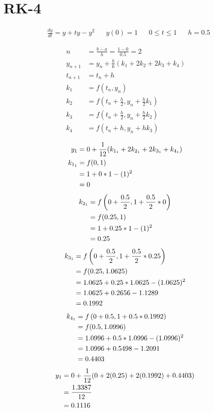 \section{RK-4}
	\begin{align}
		&\frac{dy}{dt} = y + ty - y^{2}&
		&y(0) = 1&
		&0 \leq t \leq 1&
		&h = 0.5&
	\end{align}

	\begin{align}
		n &= \frac{b-a}{h} = \frac{1 - 0}{0.5} = 2& \\
		y_{n+1} &= y_{n} + \frac{h}{6}(k_{1} + 2k_{2} + 2k_{3} + k_{4})& \\
		t_{n+1} &= t_{n} + h& \\
		k_{1} &= f(t_{n}, y_{n})& \\
		k_{2} &= f(t_{n} + \frac{h}{2}, y_{n} + \frac{h}{2}k_{1})& \\
		k_{3} &= f(t_{n} + \frac{h}{2}, y_{n} + \frac{h}{2}k_{2})& \\
		k_{4} &= f(t_{n} + h, y_{n} + hk_{3})&
	\end{align}

	\begin{align}
		y_{1} &= 0 + \frac{1}{12}(k_{1_{1}} + 2k_{2_{1}} + 2k_{3_{1}} + k_{4_{1}})& \\
		k_{1_{1}} &= f(0,1)& \notag \\
		&= 1 + 0*1 - (1)^{2}& \notag \\
		&= 0&
	\end{align}
	\begin{align}
		k_{2_{1}} &= f
			\left(
				0 + \frac{0.5}{2}, 1 + \frac{0.5}{2}*0
			\right)
			& \notag \\
		&= f(0.25, 1)& \notag \\
		&= 1 + 0.25*1 - (1)^{2}& \notag \\
		&= 0.25&
	\end{align}
	\begin{align}
		k_{3_{1}} &= f
			\left(
				0 + \frac{0.5}{2}, 1 + \frac{0.5}{2}*0.25
			\right)
			& \notag \\
		&= f(0.25, 1.0625)& \notag \\
		&= 1.0625 + 0.25*1.0625 - (1.0625)^{2}& \notag \\
		&= 1.0625 + 0.2656 - 1.1289& \notag \\
		&= 0.1992&
	\end{align}
	\begin{align}
		k_{4_{1}} &= f
			\left(
				0 + 0.5, 1 + 0.5*0.1992
			\right)
			& \notag \\
		&= f(0.5, 1.0996)& \notag \\
		&= 1.0996 + 0.5*1.0996 - (1.0996)^{2}& \notag \\
		&= 1.0996 + 0.5498 - 1.2091& \notag \\
		&= 0.4403&
	\end{align}
	\begin{align}
		y_{1} &= 0 + \frac{1}{12}(0 + 2(0.25) + 2(0.1992) + 0.4403)& \notag \\
		&= \frac{1.3387}{12}& \notag \\
		&= 0.1116&
	\end{align}

